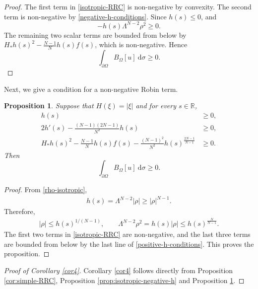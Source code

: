 \documentclass[reqno, 11pt]{amsart} %
\numberwithin{equation}{section}
\newtheorem{prop}[thm]{Proposition}
\theoremstyle{definition}
\newcommand{\pa}{\partial}
\newcommand{\R}{\mathbb{R}}
\begin{document}
\begin{proof}
The first term in \eqref{isotropic-RRC} is non-negative by convexity.  The second term is non-negative by \eqref{negative-h-conditions}.  Since $h(s)\le0$, and
$$ -h(s)\Lambda^{N-2}\rho^2\ge0.$$ The remaining two scalar terms are bounded from below by $H_*h(s)^2- \frac{N-1}{N}h(s)f(s)$, which is non-negative.  Hence $$\int_{\pa \Omega} B_{\Omega}[u]\ \text{d} \sigma  \geq 0.$$
\end{proof}

Next, we give a condition for a non-negative Robin term.
\begin{prop}\label{prop:isotropic-positive-h}
Suppose that $H(\xi)=|\xi|$ and for every $s\in \R$,
\begin{align}\label{positive-h-conditions}
       h(s)&\ge0,\nonumber\\
       2h'(s)- \frac{(N-1)(2N-1)}{N^2} h(s)&\ge0,\\
       H_*h(s)^2- \frac{N-1}{N} h(s)f(s)-\frac{(N-1)^2}{N^2}h(s)^{\frac{2N-1}{N-1}}&\ge0.\nonumber
\end{align}
Then $$\int_{\pa \Omega} B_{\Omega}[u]  \ \text{d} \sigma \geq 0.$$
\end{prop}

\begin{proof}
From \eqref{rho-isotropic},
\begin{align*}
       h(s)=\Lambda^{N-2}|\rho|\ge|\rho|^{N-1}.
\end{align*}
Therefore,
\begin{align*}
       |\rho|\le h(s)^{1/(N-1)},
       \qquad \Lambda^{N-2}\rho^2=h(s)|\rho|\le h(s)^{\frac{N}{N-1}}.
\end{align*}
The first two terms in \eqref{isotropic-RRC} are non-negative, and the last three terms are bounded from below by the last line of \eqref{positive-h-conditions}.  This proves the proposition.
\end{proof}



\begin{proof}[Proof of Corollary \ref{cor4}]
Corollary \ref{cor4} follows directly from Proposition \ref{cor:simple-RRC}, Proposition \ref{prop:isotropic-negative-h} and Proposition \ref{prop:isotropic-positive-h}.
\end{proof}
\end{document}
